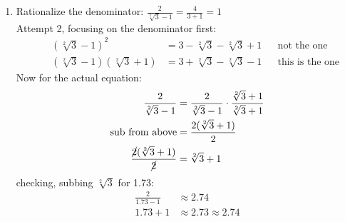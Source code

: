 \documentclass{article}
\begin{document}
\begin{enumerate}
  \item Rationalize the denominator: $\frac{2}{\sqrt[2]{3} - 1} = \frac{4}{3 + 1} = 1$ \\
    Attempt 2, focusing on the denominator first: 
    \begin{align*}
      && (\sqrt[2]{3} - 1)^{2} &= 3 - \sqrt[2]{3} - \sqrt[2]{3} + 1 && \text{not the one} \\
      && (\sqrt[2]{3} - 1)(\sqrt[2]{3} + 1) &= 3 + \sqrt[2]{3} - \sqrt[2]{3} - 1 && \text{this is the one}
    \end{align*}
    Now for the actual equation:
    \begin{align*}
      \frac{2}{\sqrt[2]{3} - 1} &= \frac{2}{\sqrt[2]{3} - 1} \cdot \frac{\sqrt[2]{3} + 1}{\sqrt[2]{3} + 1} \\
      \text{sub from above} &= \frac{2(\sqrt[2]{3} + 1)}{2} \\
      \frac{\cancel{2}(\sqrt[2]{3} + 1)}{\cancel{2}} &= \sqrt[2]{3} + 1
    \end{align*}
    checking, subbing $\sqrt[2]{3}$ for 1.73:
    \begin{align*}
      \frac{2}{1.73 - 1} &\approx 2.74 \\
      1.73 + 1 &\approx 2.73 \approx 2.74
    \end{align*}
    
    

\end{enumerate}
\end{document}
